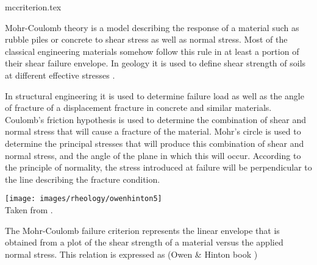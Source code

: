 \begin{flushright} {\tiny {\color{gray} mccriterion.tex}} \end{flushright}

Mohr-Coulomb theory is a model describing the response of a material such as rubble piles or concrete to shear stress as well as normal stress. 
Most of the classical engineering materials somehow follow this rule in at least a portion of their shear failure envelope. In geology it is used to define shear strength of soils at different effective stresses \cite{hand69}.

In structural engineering it is used to determine failure load as well as the angle of fracture of a displacement fracture in concrete and similar materials. Coulomb's friction hypothesis is used to determine the combination of shear and normal stress that will cause a fracture of the material. Mohr's circle is used to determine the principal stresses that will produce this combination of shear and normal stress, and the angle of the plane in which this will occur. According to the principle of normality, the stress introduced at failure will be perpendicular to the line describing the fracture condition.


\begin{center}
\texttt{[image: images/rheology/owenhinton5]}\\
{\captionfont Taken from \textcite{owhi}.}
\end{center}

The Mohr-Coulomb failure criterion represents the linear envelope that is obtained 
from a plot of the shear strength of a material 
versus the applied normal stress. This relation is expressed as (Owen \& Hinton book \cite[p219]{owhi})

